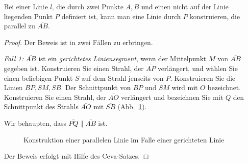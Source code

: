 \begin{theorem}\label{thm.straight-parallel}
Bei einer Linie $l$, die durch zwei Punkte $A,B$ und einen nicht auf der Linie liegenden Punkt $P$ definiert ist, kann man eine Linie durch $P$ konstruieren, die parallel zu $\overline{AB}$.
\end{theorem}

\begin{proof}

Der Beweis ist in zwei Fällen zu erbringen.

\textit{Fall 1:}
$\overline{AB}$ ist ein \emph{gerichtetes Liniensegment}, wenn der Mittelpunkt $M$ von $\overline{AB}$ gegeben ist.  Konstruieren Sie einen Strahl, der $\overline{AP}$ verlängert, und wählen Sie einen beliebigen Punkt $S$ auf dem Strahl jenseits von $P$. Konstruieren Sie die Linien $\overline{BP}, \overline{SM}, \overline{SB}$. Der Schnittpunkt von $\overline{BP}$ und $\overline{SM}$ wird mit $O$ bezeichnet. Konstruieren Sie einen Strahl, der $\overline{AO}$ verlängert und bezeichnen Sie mit $Q$ den Schnittpunkt des Strahls $\overline{AO}$ mit $\overline{SB}$ (Abb.~\ref{f.se-parallel-directed}).

Wir behaupten, dass $\overline{PQ}\parallel \overline{AB}$ ist. 

\begin{figure}[ht]
\begin{center}
\end{center}
\caption{Konstruktion einer parallelen Linie im Falle einer gerichteten Linie}\label{f.se-parallel-directed}
\end{figure}
Der Beweis erfolgt mit Hilfe des Ceva-Satzes.


\end{proof}
